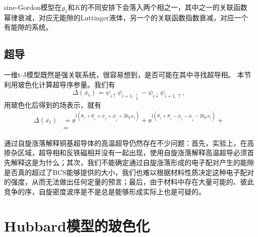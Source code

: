 sine-Gordon模型在$g_1$和$K$的不同安排下会落入两个相之一，其中之一的关联函数幂律衰减，对应无能隙的Luttinger液体，另一个的关联函数指数衰减，对应一个有能隙的系统。

\subsection{超导}

一维t-J模型既然是强关联系统，很容易想到，是否可能在其中寻找超导相。
本节利用玻色化计算超导序参量。我们有
\begin{equation}
    \Delta(x_i) = \psi_{i \uparrow} \psi_{i+1, \downarrow} - \psi_{i \downarrow} \psi_{i+1, \uparrow},
\end{equation}
用玻色化后得到的场表示，就有
\begin{equation}
    \begin{aligned}
        \Delta(x_i) &= \ee^{\ii (\theta_\uparrow + \theta_\downarrow + \phi_\uparrow + \phi_\downarrow + 2 k_\text{F} x_i)} + \ee^{\ii (\theta_\uparrow + \theta_\downarrow - \phi_\uparrow - \phi_\downarrow - 2 k_\text{F} x_i)} + \\
        &= 
    \end{aligned}
\end{equation}

通过自旋涨落解释铜基超导体的高温超导仍然存在不少问题：首先，实验上，在高掺杂区域，超导相和反铁磁相并没有一起出现，使用自旋涨落解释高温超导必须首先解释这是为什么；其次，我们不能确定通过自旋涨落形成的电子配对产生的能隙是否真的超过了BCS能够提供的大小，我们也难以根据材料性质决定这种电子配对的强度，从而无法做出任何定量的预言；最后，由于材料中存在大量可能的、彼此竞争的序，自旋密度波序是不是总是能够形成实际上也是可疑的。

\section{Hubbard模型的玻色化}

